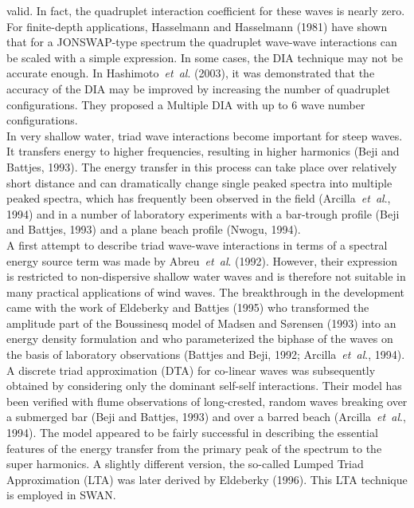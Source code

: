 \documentclass[12pt]{book}
\begin{document}
valid. In fact, the quadruplet interaction coefficient for these waves is nearly zero. For finite-depth
applications, Hasselmann and Hasselmann (1981) have shown that for a JONSWAP-type spectrum the quadruplet
wave-wave interactions can be scaled with a simple expression.
In some cases, the DIA technique may not be accurate enough. In Hashimoto~{\it et~al}. (2003), it was
demonstrated that the accuracy of the DIA may be improved by increasing the number of quadruplet
configurations. They proposed a Multiple DIA with up to 6 wave number configurations.
\\[2ex]
\noindent
In very shallow water, triad wave interactions become important for steep waves. It
transfers energy to higher frequencies, resulting in higher harmonics (Beji and Battjes, 1993).
The energy transfer in this process can take place over relatively short distance and can
dramatically change single peaked spectra into multiple peaked spectra, which has frequently
been observed in the field (Arcilla~{\it et~al}., 1994) and in a number of laboratory
experiments with a bar-trough profile (Beji and Battjes, 1993) and a plane beach profile
(Nwogu, 1994).
\\[2ex]
\noindent
A first attempt to describe triad wave-wave interactions in terms of a spectral energy source term was
made by Abreu~{\it et~al}. (1992). However, their expression is restricted to non-dispersive shallow water
waves and is therefore not suitable in many practical applications of wind waves. The breakthrough in the
development came with the work of Eldeberky and Battjes (1995) who transformed the amplitude part of
the Boussinesq model of Madsen and S{\o}rensen (1993) into an energy density formulation and who
parameterized the biphase of the waves on the basis of laboratory observations (Battjes and Beji, 1992;
Arcilla~{\it et~al}., 1994). A discrete triad approximation (DTA) for co-linear waves was subsequently
obtained by considering only the dominant self-self interactions. Their model has been verified with flume
observations of long-crested, random waves breaking over a submerged bar (Beji and Battjes, 1993) and
over a barred beach (Arcilla~{\it et~al}., 1994). The model appeared to be fairly successful in describing
the essential features of the energy transfer from the primary peak of the spectrum to the super harmonics.
A slightly different version, the so-called Lumped Triad Approximation (LTA) was later derived by
Eldeberky (1996). This LTA technique is employed in SWAN.
\nocite{Bej93B,Has98TN,Res01PTV,Vle03B,You93V,Has85HAB,Has81H,Abr92LT,Eld95B,Mad93S,Eld96}
\end{document}
